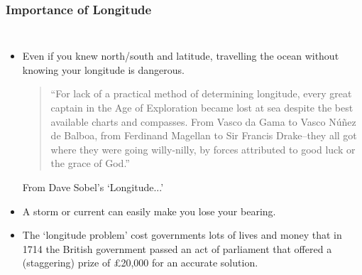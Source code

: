 \begin{frame}
\frametitle{Importance of Longitude}
\begin{columns}
	\begin{itemize}
		\item Even if you knew north/south and latitude, travelling the ocean without knowing your longitude is dangerous.
		
		\begin{flushleft}\small
			\begin{quotation}
				``For lack of a practical method of determining longitude, every great captain in the Age of Exploration became lost at sea despite the best available charts and compasses. From Vasco da Gama to Vasco N\'u\~{n}ez de Balboa, from Ferdinand Magellan to Sir Francis Drake--they all got where they were going willy-nilly, by forces attributed to good luck or the grace of God.''
			\end{quotation}
			\hfill From Dave Sobel's `Longitude...'~\cite{Sobel1995}
		\end{flushleft}
		\item A storm or current can easily make you lose your bearing.
		\item The `longitude problem' cost governments lots of lives and money that in 1714 the British government passed an act of parliament that offered a (staggering) prize of \pounds20,000 for an accurate solution. 
	\end{itemize}
	\medskip
\end{columns}
\end{frame}

